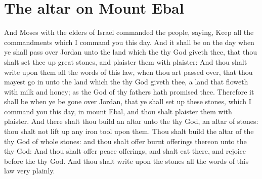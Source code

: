 \section*{The altar on Mount Ebal}
\begin{biblechapter} %
\verse And Moses with the elders of Israel commanded the people, saying, Keep all the commandments which I command you this day.
\verse And it shall be on the day when ye shall pass over Jordan unto the land which the \LORD thy God giveth thee, that thou shalt set thee up great stones, and plaister them with plaister:
\verse And thou shalt write upon them all the words of this law, when thou art passed over, that thou mayest go in unto the land which the \LORD thy God giveth thee, a land that floweth with milk and honey; as the \LORD God of thy fathers hath promised thee.
\verse Therefore it shall be when ye be gone over Jordan, that ye shall set up these stones, which I command you this day, in mount Ebal, and thou shalt plaister them with plaister.
\verse And there shalt thou build an altar unto the \LORD thy God, an altar of stones: thou shalt not lift up any iron tool upon them.
\verse Thou shalt build the altar of the \LORD thy God of whole stones: and thou shalt offer burnt offerings thereon unto the \LORD thy God:
\verse And thou shalt offer peace offerings, and shalt eat there, and rejoice before the \LORD thy God.
\verse And thou shalt write upon the stones all the words of this law very plainly.

\end{biblechapter}
